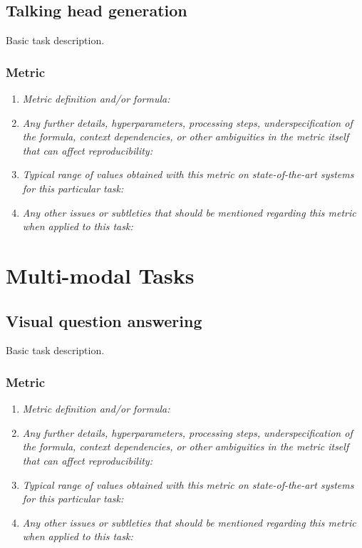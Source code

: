 \documentclass[a4paper,11pt]{article}
\begin{document}
    \subsection{Talking head generation}
    Basic task description.
    \subsubsection{Metric}
        \begin{enumerate}[label=\alph*.]
            \item \textit{Metric definition and/or formula:}
            \bigskip
            \item \textit{Any further details, hyperparameters, processing steps, underspecification of the formula, context dependencies, or other ambiguities in the metric itself that can affect reproducibility:}
            \bigskip
            \item \textit{Typical range of values obtained with this metric on state-of-the-art systems for this particular task:}
            \bigskip
            \item \textit{Any other issues or subtleties that should be mentioned regarding this metric when applied to this task:}
            \bigskip
        \end{enumerate}

\section{Multi-modal Tasks}
    \subsection{Visual question answering}
        Basic task description.
        \subsubsection{Metric}
            \begin{enumerate}[label=\alph*.]
                \item \textit{Metric definition and/or formula:}
                \bigskip
                \item \textit{Any further details, hyperparameters, processing steps, underspecification of the formula, context dependencies, or other ambiguities in the metric itself that can affect reproducibility:}
                \bigskip
                \item \textit{Typical range of values obtained with this metric on state-of-the-art systems for this particular task:}
                \bigskip
                \item \textit{Any other issues or subtleties that should be mentioned regarding this metric when applied to this task:}
                \bigskip
            \end{enumerate}
\end{document}
